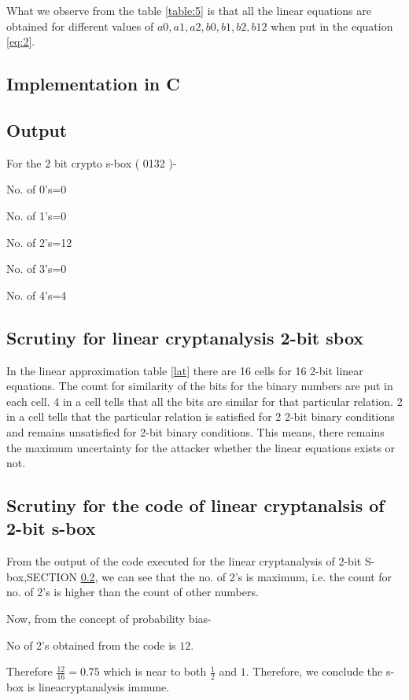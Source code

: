 \documentclass[12pt]{article}
\begin{document}
What we observe from the table \ref{table:5} is that all the linear equations are obtained for different values of $ a0,a1,a2,b0,b1,b2,b12 $ when put in the equation \ref{eq:2}.
\subsection{Implementation in C}

\subsection{Output} \label{two}

For the 2 bit crypto s-box ( 0132 )- 

No. of 0’s=0 

No. of 1’s=0 

No. of 2’s=12 

No. of 3’s=0 

No. of 4’s=4 
\subsection{Scrutiny for linear cryptanalysis 2-bit sbox}
In the linear approximation table \ref{lat}  there are 16 cells for 16 2-bit linear equations. The count for similarity of the bits for the binary numbers are put in each cell. 4 in a cell tells that all the bits are similar for that particular relation. 2 in a cell tells that the particular relation is satisfied for 2 2-bit binary conditions and remains unsatisfied for 2-bit binary conditions. This means, there remains the maximum uncertainty for the attacker whether the linear equations exists or not. 
\subsection{Scrutiny for the code of linear cryptanalsis of 2-bit s-box}
From the output of the code executed for the linear cryptanalysis of 2-bit S-box,SECTION \ref{two}, we can see that the no. of 2’s is maximum, i.e. the count for no. of 2’s is higher than the count of other numbers.  

Now, from the concept of probability bias- 

No of 2’s obtained from the code is $ 12 $. 

Therefore $ \frac{12}{16}=0.75 $ which is near to both $ \frac{1}{2} $ and $ 1 $. Therefore, we conclude the s-box is lineacryptanalysis immune.
\end{document}
